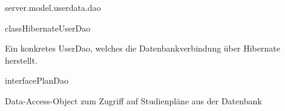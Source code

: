 \begin{texdocpackage}{server.model.userdata.dao}
\begin{texdocclass}{class}{HibernateUserDao}
\label{texdoclet:edu.kit.informatik.studyplan.server.model.userdata.dao.HibernateUserDao}
\begin{texdocclassintro}
Ein konkretes UserDao, welches die Datenbankverbindung über Hibernate herstellt.\end{texdocclassintro}
\begin{texdocclassconstructors}
\end{texdocclassconstructors}
\begin{texdocclassmethods}
\end{texdocclassmethods}
\end{texdocclass}


\begin{texdocclass}{interface}{PlanDao}
\label{texdoclet:edu.kit.informatik.studyplan.server.model.userdata.dao.PlanDao}
\begin{texdocclassintro}
Data-Access-Object zum Zugriff auf Studienpläne aus der Datenbank\end{texdocclassintro}
\begin{texdocclassmethods}
\end{texdocclassmethods}
\end{texdocclass}



\end{texdocpackage}
